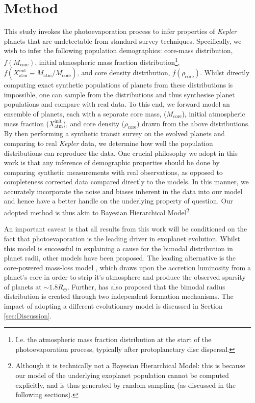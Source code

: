 \documentclass[fleqn,usenatbib]{mnras}
\begin{document}
\section{Method} \label{sec:Method}
 This study invokes the photoevaporation process to infer properties of {\it Kepler} planets that are undetectable from standard survey techniques. Specifically, we wish to infer the following population demographics: core-mass distribution, $f(M_\text{core})$, initial atmospheric mass fraction distribution\footnote{I.e. the atmospheric mass fraction distribution at the start of the photoevaporation process, typically after protoplanetary disc dispersal.}, $f(X_\text{atm}^\text{init} \equiv M_\text{atm} / M_\text{core})$, and core density distribution, $f(\rho_\text{core})$. Whilst directly computing exact synthetic populations of planets from these distributions is impossible, one can sample from the distributions and thus synthesise planet populations and compare with real data. To this end, we forward model an ensemble of planets, each with a separate core mass, ($M_\text{core}$), initial atmospheric mass fraction ($X_\text{atm}^\text{init}$), and core density ($\rho_\text{core}$) drawn from the above distributions. By then performing a synthetic transit survey on the evolved planets and comparing to real {\it Kepler} data, we determine how well the population distributions can reproduce the data. One crucial philosophy we adopt in this work is that any inference of demographic properties should be done by comparing synthetic measurements with real observations, as opposed to completeness corrected data compared directly to the models. In this manner, we accurately incorporate the noise and biases inherent in the data into our model and hence have a better handle on the underlying property of question. Our adopted method is thus akin to Bayesian Hierarchical Model\footnote{Although it is technically not a Bayesian Hierarchical Model: this is because our model of the underlying exoplanet population cannot be computed explicitly, and is thus generated by random sampling (as discussed in the following sections).}.
 
 An important caveat is that all results from this work will be conditioned on the fact that photoevaporation is the leading driver in exoplanet evolution. Whilst this model is successful in explaining a cause for the bimodal distribution in planet radii, other models have been proposed. The leading alternative is the core-powered mass-loss model \citep{Ginzburg2018, Gupta2019, Gupta2020}, which draws upon the accretion luminosity from a planet's core in order to strip it's atmosphere and produce the observed sparsity of planets at $\sim 1.8R_\oplus$. Further, \citet{Zeng2019} has also proposed that the bimodal radius distribution is created through two independent formation mechanisms. The impact of adopting a different evolutionary model is discussed in Section \ref{sec:Discussion}.
 
\end{document}
